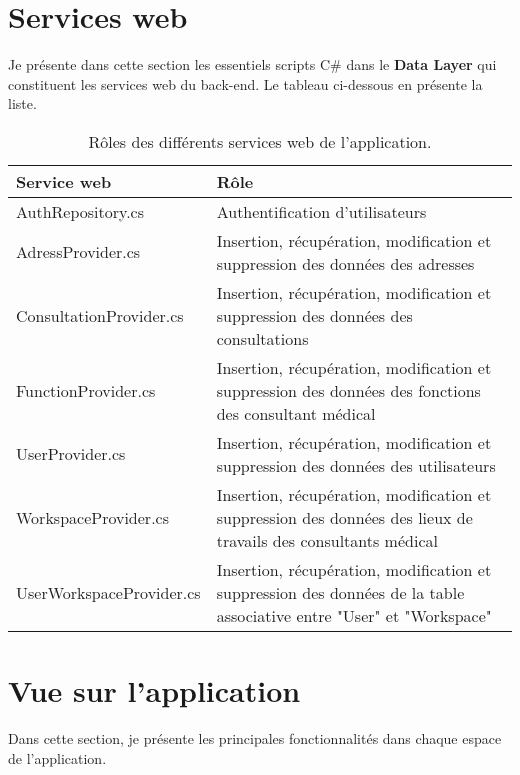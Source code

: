 \section{Services web}
Je présente dans cette section les essentiels scripts C\# dans le \textbf{Data Layer} qui constituent les services web du back-end. \newline
Le tableau ci-dessous en présente la liste.
\begin{table}[h]
	\begin{tabular}{|m{6cm}|m{10cm}|}
		\hline
		\textbf{Service web} & \textbf{Rôle} \\
		\hline
		AuthRepository.cs & Authentification d'utilisateurs \\
		\hline
		AdressProvider.cs & Insertion, récupération, modification et suppression des données des adresses \\
		\hline
		ConsultationProvider.cs & Insertion, récupération, modification et suppression des données des consultations \\
		\hline
		FunctionProvider.cs & Insertion, récupération, modification et suppression des données des fonctions des consultant médical \\
		\hline
		UserProvider.cs & Insertion, récupération, modification et suppression des données des utilisateurs \\
		\hline
		WorkspaceProvider.cs & Insertion, récupération, modification et suppression des données des lieux de travails des consultants médical \\
		\hline 
		UserWorkspaceProvider.cs & Insertion, récupération, modification et suppression des données de la table associative entre "User" et "Workspace" \\
		\hline
	\end{tabular}
	\caption{Rôles des différents services web de l'application.}
\end{table}

\section{Vue sur l’application}
Dans cette section, je présente les principales fonctionnalités dans chaque espace de l'application.
